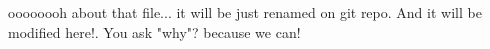 oooooooh
about that file...
it will be just renamed on git repo.
And it will be modified here!.
You ask "why"?
because we can!
